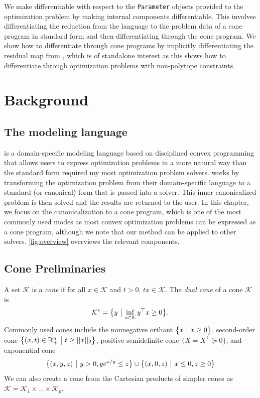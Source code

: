 We make \cvxpy differentiable with respect to the
\texttt{Parameter} objects provided to the optimization problem
by making internal \cvxpy components differentiable.
This involves differentiating the reduction from the \cvxpy
language to the problem data of a cone program in standard form
and then differentiating through the cone program.
We show how to differentiate through cone programs by
implicitly differentiating the residual map from
\citet{busseti2018solution},
which is of standalone interest as
this shows how to differentiate through optimization
problems with non-polytope constraints.

\section{Background}
\subsection{The \cvxpy modeling language}
\label{sec:bg:cvxpy}
\cvxpy \citep{diamond2016cvxpy}
is a domain-specific modeling language
based on disciplined convex programming
\citep{grant2006disciplined}
that allows users to express optimization problems
in a more natural way than the standard form
required my most optimization problem solvers.
\cvxpy works by transforming the optimization
problem from their domain-specific language to a
standard (or canonical) form that is passed into
a solver. This inner canonicalized problem is
then solved and the results are returned to
the user. In this chapter, we focus on the
canonicalization to a cone program, which is
one of the most commonly used modes as most convex
optimization problems can be expressed as a cone program,
although we note that our method can be
applied to other \cvxpy solvers.
\cref{fig:overview} overviews the relevant
\cvxpy components.

\subsection{Cone Preliminaries}
A set $\mathcal{K}$ is a \emph{cone}
if for all $x\in\mathcal{K}$ and $t>0$,
$tx\in\mathcal{K}$.
The \emph{dual cone} of a cone $\mathcal{K}$ is
$$\mathcal{K}^* =\big\{{y}~\big |~{\inf_{x\in \mathcal{K}} y^\top x\ge 0}\big\}.$$
Commonly used cones include the
nonnegative orthant $\big\{{x}~\big |~{x\geq 0}\big\}$,
second-order cone $\big\{{(x,t)\in\mathbb{R}^n_+}~\big |~{t\geq ||x||_2}\big\}$,
positive semidefinite cone $\{X=X^\top \succeq 0\}$,
and
exponential cone
\begin{equation}
  \big\{{(x,y,z)}~\big |~{y>0, ye^{x/y} \leq z}\big\} \cup
  \big\{{(x,0,z)}~\big |~{x\leq 0, z\geq 0}\big\}
\end{equation}
We can also create a cone from the Cartesian
products of simpler cones as
$\mathcal{K}=\mathcal{K}_1\times \ldots \times\mathcal{K}_p$.

